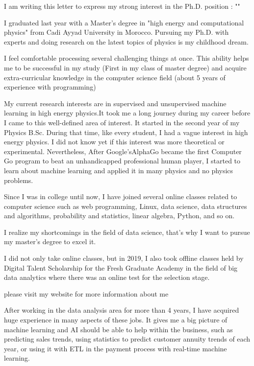 \begin{cvletter}
I am writing this letter to express my strong interest in the Ph.D. position : "\thesis"


I graduated last year with a Master's degree in "high energy and computational physics" from Cadi Ayyad University in Morocco. Pursuing my Ph.D. with experts and doing research on the latest topics of physics is my childhood dream.

I feel comfortable processing several challenging things at once. This ability helps me to be successful in my study (First in my class of master degree) and acquire extra-curricular knowledge in the computer science field (about 5 years of experience with programming)


My current research interests are in supervised and unsupervised machine learning in high energy physics.It took me a long journey during my career before I came to this well-defined area of interest. It started in the second year of my Physics B.Sc. During that time, like every student, I had a vague interest in high energy physics. I did not know yet if this interest was more theoretical or experimental. Nevertheless, After Google’sAlphaGo became the first Computer Go program to beat an unhandicapped professional human player, I started to learn about machine learning and applied it in many physics and no physics problems.


Since I was in college until now, I have joined several online classes related to computer science such as web programming, Linux, data science, data structures and algorithms, probability and statistics, linear algebra, Python, and so on.

I realize my shortcomings in the field of data science, that's why I want to pursue my master's degree to excel it.

I did not only take online classes, but in 2019, I also took offline classes held by Digital Talent Scholarship for the Fresh Graduate Academy in the field of big data analytics where there was an online test for the selection stage.


please visit my website for more information about me

After working in the data analysis area for more than 4 years, I have acquired huge experience in many aspects of these jobs. It gives me a big picture of machine learning and AI should be able to help within the business, such as predicting sales trends, using statistics to predict customer annuity trends of each year, or using it with ETL in the payment process with real-time machine learning.



\end{cvletter}
